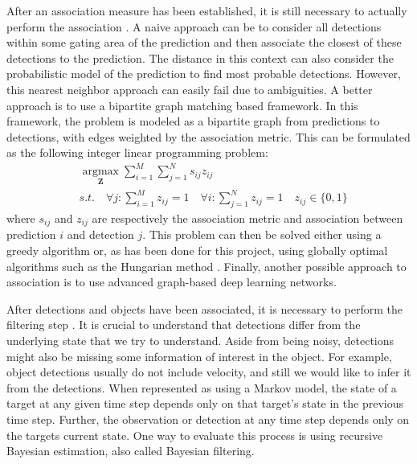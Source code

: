After an association measure has been established, it is still necessary to actually perform the association \parencite{Lanz2026Notes}. A naive approach can be to consider all detections within some gating area of the prediction and then associate the closest of these detections to the prediction. The distance in this context can also consider the probabilistic model of the prediction to find most probable detections. However, this nearest neighbor approach can easily fail due to ambiguities. A better approach is to use a bipartite graph matching based framework. In this framework, the problem is modeled as a bipartite graph from predictions to detections, with edges weighted by the association metric. This can be formulated as the following integer linear programming problem:
\begin{align*}
  & \operatorname*{argmax}_{\mathbf{Z}} \sum_{i=1}^{M} \sum_{j=1}^{N} s_{ij} z_{ij} \\
  & s.t. \quad \forall j: \sum_{i=1}^{M} z_{ij} = 1 \quad \forall i: \sum_{j=1}^{N} z_{ij} = 1 \quad z_{ij} \in \{0, 1\}
\end{align*}
where $s_{ij}$ and $z_{ij}$ are respectively the association metric and association between prediction $i$ and detection $j$. This problem can then be solved either using a greedy algorithm or, as has been done for this project, using globally optimal algorithms such as the Hungarian method \parencite{kuhn1955hungarian}. Finally, another possible approach to association is to use advanced graph-based deep learning networks.

After detections and objects have been associated, it is necessary to perform the filtering step \parencite{Lanz2026Notes}. It is crucial to understand that detections differ from the underlying state that we try to understand. Aside from being noisy, detections might also be missing some information of interest in the object. For example, object detections usually do not include velocity, and still we would like to infer it from the detections. When represented as using a Markov model, the state of a target at any given time step depends only on that target's state in the previous time step. Further, the observation or detection at any time step depends only on the targets current state. One way to evaluate this process is using recursive Bayesian estimation, also called Bayesian filtering.

